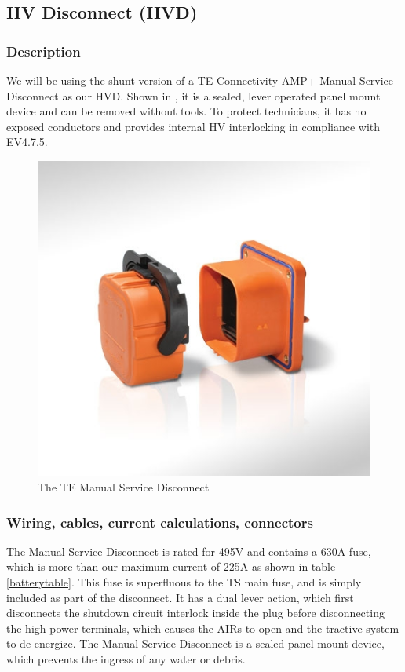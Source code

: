 \documentclass{article}
\begin{document}
\subsection{HV Disconnect (HVD)}\label{hv_disconnect}
\subsubsection{Description}
We will be using the shunt version of a TE Connectivity AMP+ Manual Service Disconnect as our HVD. Shown in , it is a sealed, lever operated panel mount device and can be removed without tools. To protect technicians, it has no exposed conductors and provides internal HV interlocking in compliance with EV4.7.5. 

\begin{figure}[h]
\centering
\includegraphics[scale=.7]{TE_Manual_Service_Disconnect.jpg}
\caption{The TE Manual Service Disconnect}
\label{fig:TE_MSD}
\end{figure}

\subsubsection{Wiring, cables, current calculations, connectors}
The Manual Service Disconnect is rated for 495V and contains a 630A fuse, which is more than our maximum current of 225A as shown in table \ref{batterytable}. This fuse is superfluous to the TS main fuse, and is simply included as part of the disconnect.  It has a dual lever action, which first disconnects the shutdown circuit interlock inside the plug before disconnecting the high power terminals, which causes the AIRs to open and the tractive system to de-energize. The Manual Service Disconnect is a sealed panel mount device, which prevents the ingress of any water or debris. \\
\end{document}

